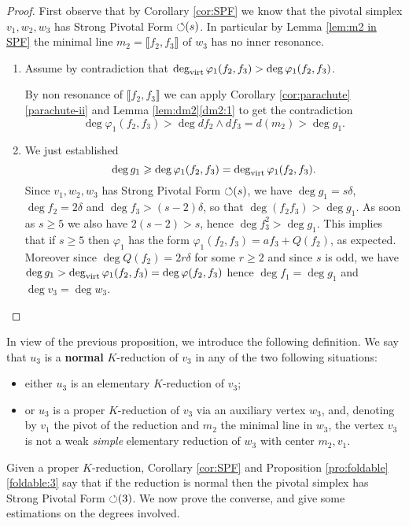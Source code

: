\documentclass[reqno,oneside,11pt]{amsart}
\theoremstyle{plain}
\theoremstyle{definition}
\newcommand{\PF}{\text{$\circlearrowleft$\!\,}}
\renewcommand{\phi}{\varphi}
\newcommand{\dvirt}{\deg_{\text{\rm virt}}}
\newcommand{\llb}{\llbracket}
\newcommand{\rrb}{\rrbracket}
\renewcommand{\ge}{\geqslant}
\begin{document}
\begin{proof}
First observe that by Corollary \ref{cor:SPF} we know that the pivotal simplex $v_1, w_2, w_3$ has Strong Pivotal Form $\PF(s)$.
In particular by Lemma \ref{lem:m2 in SPF} the minimal line $m_2 = \llb f_2, f_3 \rrb$ of $w_3$ has no inner resonance.

\begin{enumerate}[wide]
\item Assume by contradiction that $\dvirt \phi_1(f_2,f_3) > \deg \phi_1(f_2,f_3)$.

By non resonance of $\llb f_2, f_3 \rrb$ we can apply Corollary \ref{cor:parachute}\ref{parachute-ii} and Lemma \ref{lem:dm2}\ref{dm2:1} to get the contradiction
\begin{equation*}
\deg \phi_1(f_2,f_3) > \deg df_2 \wedge df_3 = d(m_2) >  \deg g_1.
\end{equation*}

\item We just established
$$\deg g_1 \ge  \deg \phi_1(f_2,f_3) = \dvirt \phi_1(f_2,f_3).$$
Since $v_1, w_2,w_3$ has Strong Pivotal Form $\PF(s)$, we have $\deg g_1 = s\delta$, $\deg f_2 = 2\delta$ and  $\deg f_3 > (s-2)\delta$, so that $\deg (f_2f_3) > \deg g_1$.
As soon as $s \ge 5$ we also have $2(s-2) > s$, hence $\deg f_3^2 > \deg g_1$.
This implies that if $s \ge 5$ then $\phi_1$ has the form $\phi_1(f_2,f_3) =  a f_3 + Q(f_2)$, as expected.
Moreover since $\deg Q(f_2) = 2r\delta$ for some $r \ge 2$ and since $s$ is
odd, we have $\deg g_1 > \dvirt \phi_1(f_2,f_3) = \deg \phi(f_2,f_3)$ hence
$\deg f_1 = \deg g_1$ and $\deg v_3 = \deg w_3$.
\qedhere
\end{enumerate}
\end{proof}

In view of the previous proposition, we introduce the following definition.
We say that $u_3$ is a \textbf{normal} $K$-reduction of $v_3$ in any of the two following situations:
\begin{itemize}
\item either $u_3$ is an elementary $K$-reduction of $v_3$;
\item or $u_3$ is a proper $K$-reduction of $v_3$ via an auxiliary vertex $w_3$, and, denoting by $v_1$ the pivot of the reduction and $m_2$ the minimal line in $w_3$, the vertex $v_3$ is not a weak \textit{simple} elementary reduction of $w_3$ with center $m_2, v_1$.
\end{itemize}

Given a proper $K$-reduction, Corollary \ref{cor:SPF} and Proposition
\ref{pro:foldable}\ref{foldable:3} say that if the reduction is normal then the
pivotal simplex has Strong Pivotal Form $\PF(3)$.
We now prove the converse, and give some estimations on the degrees
involved.
\end{document}
